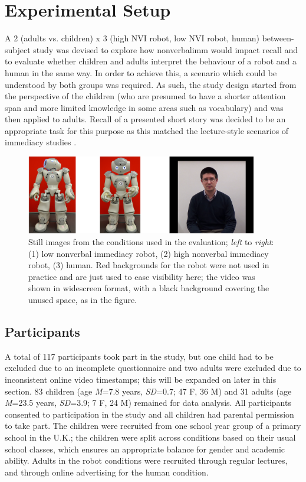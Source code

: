 \section{Experimental Setup} \label{sec:nvi-setup}
A 2 (adults vs. children) x 3 (high NVI robot, low NVI robot, human) between-subject study was devised to explore how \gls{nonverbalimm} would impact recall and to evaluate whether children and adults interpret the behaviour of a robot and a human in the same way. In order to achieve this, a scenario which could be understood by both groups was required. As such, the study design started from the perspective of the children (who are presumed to have a shorter attention span and more limited knowledge in some areas such as vocabulary) and was then applied to adults. Recall of a presented short story was decided to be an appropriate task for this purpose as this matched the lecture-style scenarios of \gls{immediacy} studies \citep{gorham1988relationship, thweatt1998impact}.

\begin{figure}[t!]
    \centering
    \includegraphics[width=0.9\textwidth]{images/ch4_conditions.png}
    \caption{Still images from the conditions used in the evaluation; \textit{left} to \textit{right}: (1) low nonverbal immediacy robot, (2) high nonverbal immediacy robot, (3) human. Red backgrounds for the robot were not used in practice and are just used to ease visibility here; the video was shown in widescreen format, with a black background covering the unused space, as in the figure.}
    \label{fig:ch4_conditions}
\end{figure}

\subsection{Participants}
A total of 117 participants took part in the study, but one child had to be excluded due to an incomplete questionnaire and two adults were excluded due to inconsistent online video timestamps; this will be expanded on later in this section. 83 children (age \textit{M}=7.8 years, \textit{SD}=0.7; 47 F, 36 M) and 31 adults (age \textit{M}=23.5 years, \textit{SD}=3.9; 7 F, 24 M) remained for data analysis. All participants consented to participation in the study and all children had parental permission to take part. The children were recruited from one school year group of a primary school in the U.K.; the children were split across conditions based on their usual school classes, which ensures an appropriate balance for gender and academic ability. Adults in the robot conditions were recruited through regular lectures, and through online advertising for the human condition.

